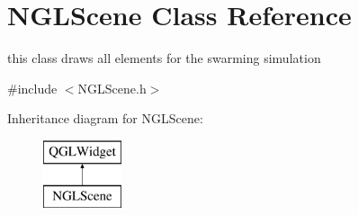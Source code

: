 \hypertarget{classNGLScene}{\section{N\-G\-L\-Scene Class Reference}
\label{classNGLScene}
}


this class draws all elements for the swarming simulation  




{\ttfamily \#include $<$N\-G\-L\-Scene.\-h$>$}

Inheritance diagram for N\-G\-L\-Scene\-:\begin{figure}[H]
\begin{center}
\leavevmode
\includegraphics[height=2.000000cm]{classNGLScene}
\end{center}
\end{figure}

